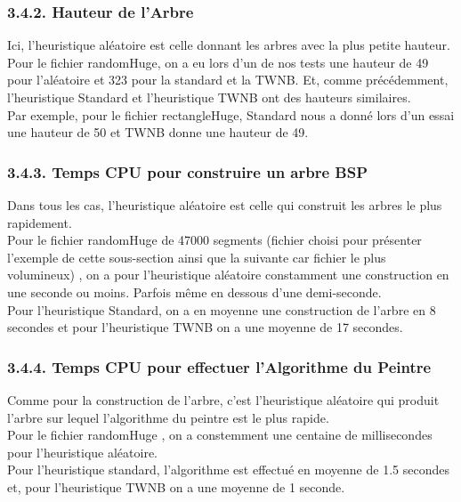\documentclass[a4paper,12pt]{report}	%
\begin{document}
    {\subsubsection*{3.4.2. Hauteur de l'Arbre}}
      Ici, l'heuristique aléatoire est celle donnant les arbres avec la plus petite hauteur. Pour le fichier randomHuge, on a eu lors d'un de nos tests une hauteur de 49 pour l'aléatoire et 323 pour la standard et la TWNB. Et, comme précédemment, l'heuristique Standard et l'heuristique TWNB ont des hauteurs similaires. \\
\indent Par exemple, pour le fichier rectangleHuge, Standard nous a donné lors d'un essai une hauteur de 50 et TWNB donne une hauteur de 49.\\
    
    {\subsubsection*{3.4.3. Temps CPU pour construire un arbre BSP}}
     Dans tous les cas, l'heuristique aléatoire est celle qui construit les arbres le plus rapidement. \\
\indent Pour le fichier randomHuge de 47000 segments (fichier choisi pour présenter l'exemple de cette sous-section ainsi que la suivante car fichier le plus volumineux) , on a pour l'heuristique aléatoire constamment une construction en une seconde ou moins. Parfois même en dessous d'une demi-seconde. \\
\indent Pour l'heuristique Standard, on a en moyenne une construction de l'arbre en 8 secondes et pour l'heuristique TWNB on a une moyenne de 17 secondes. \\
        
    {\subsubsection*{3.4.4. Temps CPU pour effectuer l'Algorithme du Peintre}}
      Comme pour la construction de l'arbre, c'est l'heuristique aléatoire qui produit l'arbre sur lequel l'algorithme du peintre est le plus rapide. \\
\indent Pour le fichier randomHuge , on a constemment une centaine de millisecondes pour l'heuristique aléatoire. \\ 
\indent Pour l'heuristique standard, l'algorithme est effectué en moyenne de 1.5 secondes et, pour l'heuristique TWNB on a une moyenne de 1 seconde.\\
    
\end{document}
